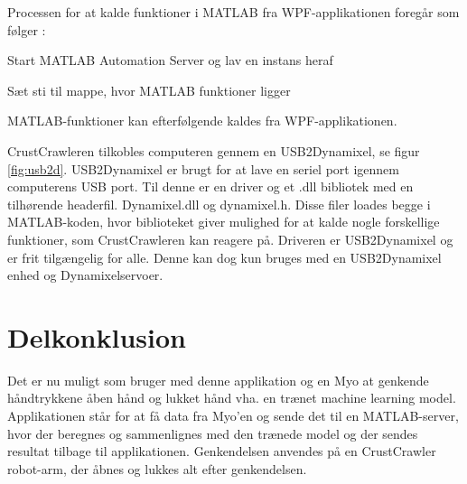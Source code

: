 
Processen for at kalde funktioner i MATLAB fra WPF-applikationen foregår som følger \citep{RefWorks:15}:
\begin{myEnumerate}
	\item Start MATLAB Automation Server og lav en instans heraf
	\item Sæt sti til mappe, hvor MATLAB funktioner ligger
	\item MATLAB-funktioner kan efterfølgende kaldes fra WPF-applikationen.
\end{myEnumerate}


CrustCrawleren tilkobles computeren gennem en USB2Dynamixel, se figur \ref{fig:usb2d}. USB2Dynamixel er brugt for at lave en seriel port igennem computerens USB port. Til denne er en driver og et .dll bibliotek med en tilhørende headerfil. Dynamixel.dll og dynamixel.h. Disse filer loades begge i MATLAB-koden, hvor biblioteket giver mulighed for at kalde nogle forskellige funktioner, som CrustCrawleren kan reagere på. Driveren er USB2Dynamixel \citep{agaverobot} og er frit tilgængelig for alle. Denne kan dog kun bruges med en USB2Dynamixel enhed og Dynamixelservoer.

\section{Delkonklusion}
Det er nu muligt som bruger med denne applikation og en Myo at genkende håndtrykkene åben hånd og lukket hånd vha. en trænet machine learning model. Applikationen står for at få data fra Myo'en og sende det til en MATLAB-server, hvor der beregnes og sammenlignes med den trænede model og der sendes resultat tilbage til applikationen. Genkendelsen anvendes på en CrustCrawler robot-arm, der åbnes og lukkes alt efter genkendelsen.